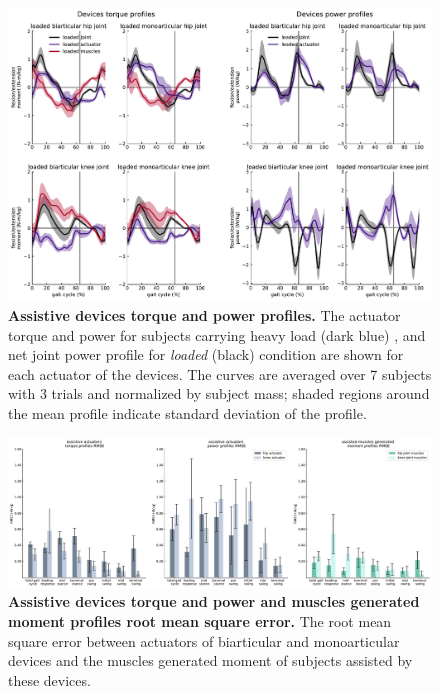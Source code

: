 \documentclass[10pt,letterpaper]{article}
\begin{document}
\begin{figure}[ht]   
	\centering
	\includegraphics[width=\linewidth]{Case_Studies/LoadedMono04_LoadedBi16/PaperFigure_Profiles.pdf}
	\vspace{1mm}
	\caption{{\small\textbf{Assistive devices torque and power profiles.} The actuator torque and power for subjects carrying heavy load (dark blue) , and net joint power profile for \textit{loaded} (black) condition are shown for each actuator of the devices. The curves are averaged over 7 subjects with 3 trials and normalized by subject mass; shaded regions around the mean profile indicate standard deviation of the profile.}}
	\label{Fig_Case01_Torque_Power_Profiles}
\end{figure}
\begin{figure}[ht]   
	\centering
	\includegraphics[width=\linewidth]{Case_Studies/LoadedMono04_LoadedBi16/RMSE.pdf}
	\vspace{1mm}
	\caption{\small{\textbf{Assistive devices torque and power and muscles generated moment profiles root mean square error. } The root mean square error between actuators of biarticular and monoarticular devices and the muscles generated moment of subjects assisted by these devices.}}
	\label{Fig_Case01_RMSE}
\end{figure}
\end{document}
